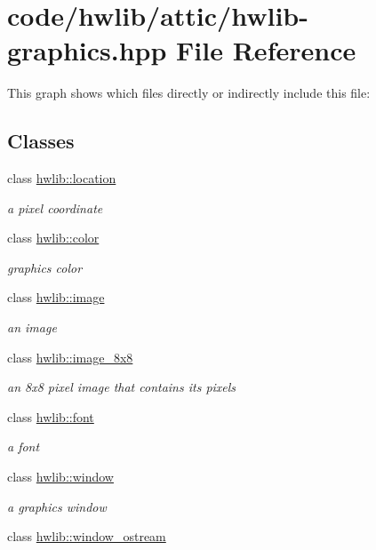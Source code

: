 \hypertarget{hwlib-graphics_8hpp}{}\section{code/hwlib/attic/hwlib-\/graphics.hpp File Reference}
\label{hwlib-graphics_8hpp}
This graph shows which files directly or indirectly include this file\+:
\subsection*{Classes}
\begin{DoxyCompactItemize}
\item 
class \hyperlink{classhwlib_1_1location}{hwlib\+::location}
\begin{DoxyCompactList}\small\item\em a pixel coordinate \end{DoxyCompactList}\item 
class \hyperlink{classhwlib_1_1color}{hwlib\+::color}
\begin{DoxyCompactList}\small\item\em graphics color \end{DoxyCompactList}\item 
class \hyperlink{classhwlib_1_1image}{hwlib\+::image}
\begin{DoxyCompactList}\small\item\em an image \end{DoxyCompactList}\item 
class \hyperlink{classhwlib_1_1image__8x8}{hwlib\+::image\+\_\+8x8}
\begin{DoxyCompactList}\small\item\em an 8x8 pixel image that contains its pixels \end{DoxyCompactList}\item 
class \hyperlink{classhwlib_1_1font}{hwlib\+::font}
\begin{DoxyCompactList}\small\item\em a font \end{DoxyCompactList}\item 
class \hyperlink{classhwlib_1_1window}{hwlib\+::window}
\begin{DoxyCompactList}\small\item\em a graphics window \end{DoxyCompactList}\item 
class \hyperlink{classhwlib_1_1window__ostream}{hwlib\+::window\+\_\+ostream}

\end{DoxyCompactItemize}
